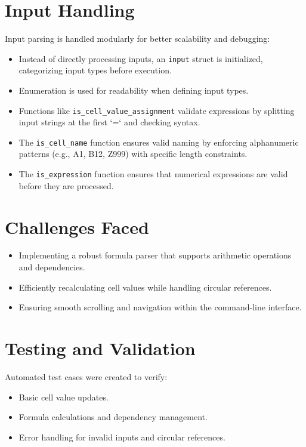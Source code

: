 \documentclass{article}
\begin{document}
\section{Input Handling}
Input parsing is handled modularly for better scalability and debugging:
\begin{itemize}
    \item Instead of directly processing inputs, an \texttt{input} struct is initialized, categorizing input types before execution.
    \item Enumeration is used for readability when defining input types.
    \item Functions like \texttt{is\_cell\_value\_assignment} validate expressions by splitting input strings at the first `=` and checking syntax.
    \item The \texttt{is\_cell\_name} function ensures valid naming by enforcing alphanumeric patterns (e.g., A1, B12, Z999) with specific length constraints.
    \item The \texttt{is\_expression} function ensures that numerical expressions are valid before they are processed.
\end{itemize}

\section{Challenges Faced}
\begin{itemize}
    \item Implementing a robust formula parser that supports arithmetic operations and dependencies.
    \item Efficiently recalculating cell values while handling circular references.
    \item Ensuring smooth scrolling and navigation within the command-line interface.
\end{itemize}

\section{Testing and Validation}
Automated test cases were created to verify:
\begin{itemize}
    \item Basic cell value updates.
    \item Formula calculations and dependency management.
    \item Error handling for invalid inputs and circular references.
\end{itemize}
\end{document}
